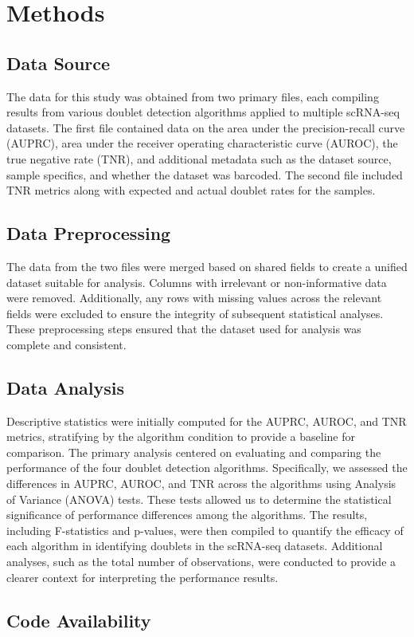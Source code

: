 \documentclass[11pt]{article}
\begin{document}
\section*{Methods}

\subsection*{Data Source}
The data for this study was obtained from two primary files, each compiling results from various doublet detection algorithms applied to multiple scRNA-seq datasets. The first file contained data on the area under the precision-recall curve (AUPRC), area under the receiver operating characteristic curve (AUROC), the true negative rate (TNR), and additional metadata such as the dataset source, sample specifics, and whether the dataset was barcoded. The second file included TNR metrics along with expected and actual doublet rates for the samples.

\subsection*{Data Preprocessing}
The data from the two files were merged based on shared fields to create a unified dataset suitable for analysis. Columns with irrelevant or non-informative data were removed. Additionally, any rows with missing values across the relevant fields were excluded to ensure the integrity of subsequent statistical analyses. These preprocessing steps ensured that the dataset used for analysis was complete and consistent.

\subsection*{Data Analysis}
Descriptive statistics were initially computed for the AUPRC, AUROC, and TNR metrics, stratifying by the algorithm condition to provide a baseline for comparison. The primary analysis centered on evaluating and comparing the performance of the four doublet detection algorithms. Specifically, we assessed the differences in AUPRC, AUROC, and TNR across the algorithms using Analysis of Variance (ANOVA) tests. These tests allowed us to determine the statistical significance of performance differences among the algorithms. The results, including F-statistics and p-values, were then compiled to quantify the efficacy of each algorithm in identifying doublets in the scRNA-seq datasets. Additional analyses, such as the total number of observations, were conducted to provide a clearer context for interpreting the performance results.\subsection*{Code Availability}
\end{document}

